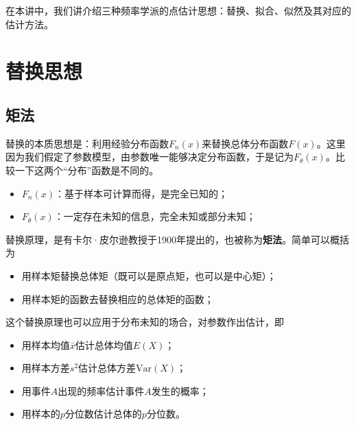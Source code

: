 在本讲中，我们讲介绍三种频率学派的点估计思想：替换、拟合、似然及其对应的估计方法。

\section{替换思想}
\subsection{矩法}
替换的本质思想是：利用经验分布函数$F_n(x)$来替换总体分布函数$F(x)$。这里因为我们假定了参数模型，由参数唯一能够决定分布函数，于是记为$F_{\theta}(x)$。比较一下这两个“分布”函数是不同的。
\begin{itemize}
    \item $F_n(x)$：基于样本可计算而得，是完全已知的；
\item $F_{\theta}(x)$：一定存在未知的信息，完全未知或部分未知；
\end{itemize}

替换原理，是有卡尔·皮尔逊教授于1900年提出的，也被称为\textbf{矩法}。简单可以概括为
\begin{itemize}
    \item 用样本矩替换总体矩（既可以是原点矩，也可以是中心矩）；
    \item 用样本矩的函数去替换相应的总体矩的函数；
\end{itemize}
这个替换原理也可以应用于分布未知的场合，对参数作出估计，即
\begin{itemize}
    \item 用样本均值$\bar{x}$估计总体均值$E(X)$；
    \item 用样本方差$s^2$估计总体方差$\text{Var}(X)$；
    \item 用事件$A$出现的频率估计事件$A$发生的概率；
    \item 用样本的$p$分位数估计总体的$p$分位数。
\end{itemize}
